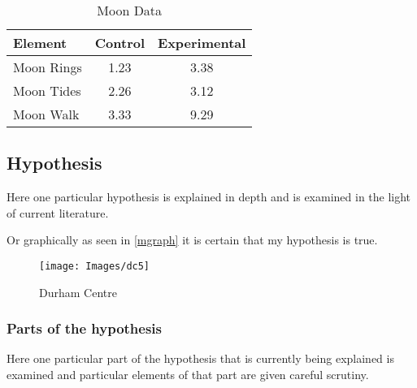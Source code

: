 \begin{table}[h!tb] \centering
    \caption{Moon Data}
    \label{data}
    \begin{tabular}{lcc} \hline
        \textbf{Element} & \textbf{Control} & \textbf{Experimental} \\ \hline
        Moon Rings       & 1.23             & 3.38                  \\
        Moon Tides       & 2.26             & 3.12                  \\
        Moon Walk        & 3.33             & 9.29                  \\ \hline
    \end{tabular}
\end{table}

\subsection{Hypothesis}

Here one particular hypothesis is explained in depth
and is examined in the light of current literature.

Or graphically as seen in \autoref{mgraph}
it is certain that my hypothesis is true.

\begin{figure}[h!tb] \centering

    \texttt{[image: Images/dc5]}

    \caption{Durham Centre}
    \label{mgraph}
\end{figure}

\subsubsection{Parts of the hypothesis}

Here one particular part of the hypothesis that is
currently being explained is examined and particular
elements of that part are given careful scrutiny.


